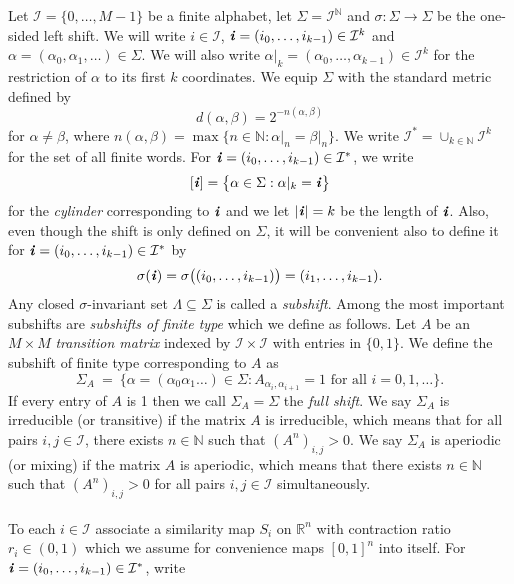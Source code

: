 \documentclass[11pt,english,british]{article}
\numberwithin{equation}{section}
\begin{document}
Let $\mathcal{I} = \{0, \dots, M-1\}$ be a finite alphabet, let $\Sigma  = \mathcal{I}^{\mathbb{N}}$ and $\sigma : \Sigma \to \Sigma$ be the one-sided left shift.  We will write $i \in \mathcal{I}$, $\textbf{\emph{i}} = (i_0 , \dots, i_{k-1}) \in \mathcal{I}^k$ and $\alpha = (\alpha_0, \alpha_1, \dots) \in \Sigma$.  We will also write $\alpha\vert_k = (\alpha_0, \dots, \alpha_{k-1}) \in \mathcal{I}^k$ for the restriction of $\alpha$ to its first $k$ coordinates.  We equip $\Sigma$ with the standard metric defined by
\[
d(\alpha,\beta) = 2^{-n(\alpha,\beta)}
\]
for $\alpha \neq \beta$, where $n(\alpha,\beta) = \max\{ n \in \mathbb{N} : \alpha\vert_n = \beta\vert_n\}$.  We write $\mathcal{I}^* = \cup_{k \in \mathbb{N}} \mathcal{I}^k$ for the set of all finite words. For $\textbf{\emph{i}} = (i_0 , \dots, i_{k-1}) \in \mathcal{I}^*$, we write
\[
[\textbf{\emph{i}}]  = \big\{ \alpha \in \Sigma : \alpha \vert_k = \textbf{\emph{i}} \big\}
\]
for the  \emph{cylinder} corresponding to $\textbf{\emph{i}}$ and we let $|\textbf{\emph{i}}|=k$ be the length of $\textbf{\emph{i}}$.  Also, even though the shift is only defined on $\Sigma$, it will be convenient also to define it for $\textbf{\emph{i}} = (i_0 , \dots, i_{k-1}) \in \mathcal{I}^*$ by
\[
\sigma( \textbf{\emph{i}} ) = \sigma \big( (i_0 , \dots, i_{k-1}) \big) = (i_1 , \dots, i_{k-1}).
\]
Any closed $\sigma$-invariant set $\Lambda \subseteq \Sigma$ is called a \emph{subshift}.  Among the most important subshifts are \emph{subshifts of finite type} which we define as follows.   Let $A$ be an $M \times M$ \emph{transition matrix} indexed by $\mathcal{I} \times \mathcal{I}$ with entries in $\{0,1\}$.  We define the subshift of finite type corresponding to $A$ as
\[
\Sigma_A \ = \ \Big\{\alpha = (\alpha_0 \alpha_1 \dots ) \in \Sigma : A_{\alpha_i, \alpha_{i+1}} = 1 \text{ for all } i =0, 1, \dots  \Big\}.
\]
If every entry of $A$ is 1 then we call $\Sigma_A = \Sigma$ the \emph{full shift}.  We say $\Sigma_A$ is irreducible (or transitive) if the matrix $A$ is irreducible, which means that for all pairs $i,j \in \mathcal{I}$, there exists $n \in \mathbb{N}$ such that $(A^n)_{i,j} >0$.  We say $\Sigma_A$ is aperiodic (or mixing) if the matrix $A$ is aperiodic, which means that there exists $n \in \mathbb{N}$ such that $(A^n)_{i,j} >0$ for all pairs $i,j \in \mathcal{I}$ simultaneously.
\\ \\
To each $i \in \mathcal{I}$ associate a similarity map $S_i$ on $\mathbb{R}^n$ with contraction ratio $r_i \in (0,1)$ which we assume for convenience maps $[0,1]^n$ into itself.   For $\textbf{\emph{i}} = (i_0 , \dots, i_{k-1}) \in \mathcal{I}^*$, write
\end{document}
